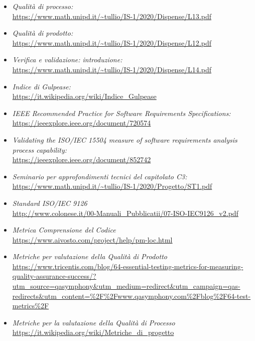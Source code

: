 \begin{itemize}
	\item \textit{Qualità di processo:}\\
		\url{https://www.math.unipd.it/~tullio/IS-1/2020/Dispense/L13.pdf}
	\item \textit{Qualità di prodotto:}\\
		\url{https://www.math.unipd.it/~tullio/IS-1/2020/Dispense/L12.pdf}
	\item \textit{Verifica e validazione: introduzione:}\\
		\url{https://www.math.unipd.it/~tullio/IS-1/2020/Dispense/L14.pdf}
	\item \textit{Indice di Gulpease:}\\
		\url{https://it.wikipedia.org/wiki/Indice_Gulpease}
	\item \textit{IEEE Recommended Practice for Software Requirements Specifications:}\\
		\url{https://ieeexplore.ieee.org/document/720574}
	\item \textit{Validating the ISO/IEC 15504 measure of software requirements analysis process capability:}\\
		\url{https://ieeexplore.ieee.org/document/852742}
	\item \textit{Seminario per approfondimenti tecnici del capitolato C3:}\\
		\url{https://www.math.unipd.it/~tullio/IS-1/2020/Progetto/ST1.pdf}	
	\item \textit{Standard ISO/IEC 9126} \\
		\url{http://www.colonese.it/00-Manuali_Pubblicatii/07-ISO-IEC9126_v2.pdf}
	\item \textit{Metrica Comprensione del Codice} \\
		\url{https://www.aivosto.com/project/help/pm-loc.html}
	\item \textit{Metriche per valutazione della Qualità di Prodotto} \\
		\url{https://www.tricentis.com/blog/64-essential-testing-metrics-for-measuring-quality-assurance-success/?utm_source=qasymphony&utm_medium=redirect&utm_campaign=qas-redirects&utm_content=%2F%2Fwww.qasymphony.com%2Fblog%2F64-test-metrics%2F}
	\item \textit{Metriche per la valutazione della Qualità di Processo} \\
		\url{https://it.wikipedia.org/wiki/Metriche_di_progetto}
\end{itemize}